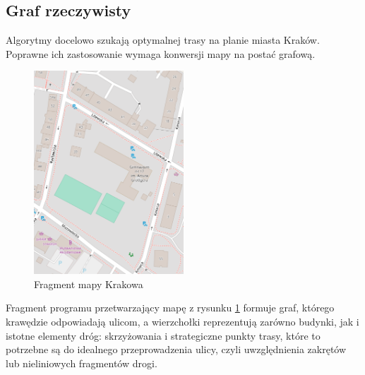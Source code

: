 \documentclass[a4paper, 12pt, twoside, openright]{article}
\begin{document}
\subsection{Graf rzeczywisty}\label{grafRzecz}
\indent\par
Algorytmy docelowo szukają optymalnej trasy na planie miasta Kraków. Poprawne ich zastosowanie wymaga konwersji mapy na postać grafową. 

\begin{figure}[H]
	\centering
	\includegraphics[width=0.5\textwidth]{img/grafRzecz/osm1}
	\caption[]{Fragment mapy Krakowa\footnotemark}
	\label{osm1}
\end{figure}


Fragment programu przetwarzający mapę z rysunku \ref{osm1} formuje graf, którego krawędzie odpowiadają ulicom, a wierzchołki reprezentują zarówno budynki, jak i istotne elementy dróg: skrzyżowania i strategiczne punkty trasy, które to potrzebne są do idealnego przeprowadzenia ulicy, czyli uwzględnienia zakrętów lub nieliniowych fragmentów drogi.
\end{document}
